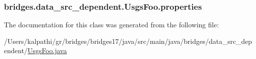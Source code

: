 \subsubsection[{properties}]{ bridges.\+data\+\_\+src\+\_\+dependent.\+Usgs\+Foo.\+properties}\label{classbridges_1_1data__src__dependent_1_1_usgs_foo_a030d83e136f146824b5bda34a4c6fd1c}


The documentation for this class was generated from the following file\+:\begin{DoxyCompactItemize}
\item 
/\+Users/kalpathi/gr/bridges/bridges17/java/src/main/java/bridges/data\+\_\+src\+\_\+dependent/\hyperlink{_usgs_foo_8java}{Usgs\+Foo.\+java}\end{DoxyCompactItemize}
